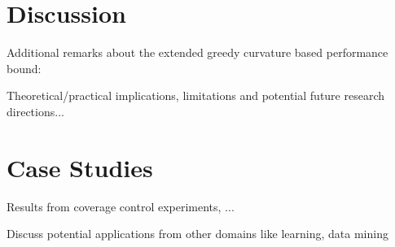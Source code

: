 \documentclass[letterpaper, 10 pt, conference]{ieeeconf}
\newcommand{\R}{\mathbb{R}}
\newtheorem{definition}{Definition}
\begin{document}
\section{Discussion}\label{Sec:Discussion}

Additional remarks about the extended greedy curvature based performance bound: 

Theoretical/practical implications, limitations and potential future research directions...


\section{Case Studies}
\label{Sec:CaseStudies}

Results from coverage control experiments, ...

Discuss potential applications from other domains like learning, data mining 




\end{document}
